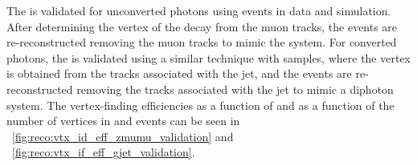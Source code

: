 The \VtxIdBdt is validated for unconverted photons using \Zmumu events in data and simulation. After determining the vertex of the decay from the muon tracks, the events are re-reconstructed removing the muon tracks to mimic the \Hgg system. For converted photons, the \VtxIdBdt is validated using a similar technique with \gammaJet samples, where the vertex is obtained from the tracks associated with the jet, and the events are re-reconstructed removing the tracks associated with the jet to mimic a diphoton system. The vertex-finding efficiencies as a function of \pT and as a function of the number of vertices in \Zmumu and \gammaJet events can be seen in \Fig~\ref{fig:reco:vtx_id_eff_zmumu_validation} and \Fig~\ref{fig:reco:vtx_if_eff_gjet_validation}. %

